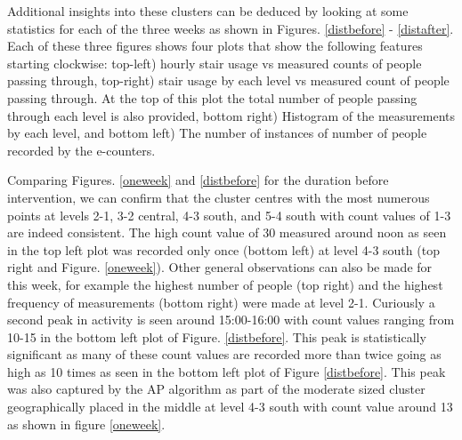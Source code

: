  
Additional insights into these clusters can be deduced by looking at some statistics for each of the three weeks as shown in Figures. \ref{distbefore} - \ref{distafter}. Each of these three figures shows four plots that show the following features starting clockwise: top-left) hourly stair usage vs measured counts of people passing through, top-right) stair usage by each level vs measured count of people passing through. At the top of this plot the total number of people passing through each level is also provided, bottom right) Histogram of the measurements by each level, and bottom left) The number of instances of number of people recorded by the e-counters.


Comparing Figures. \ref{oneweek} and \ref{distbefore} for the duration before intervention, we can confirm that the cluster centres with the most numerous points at levels 2-1, 3-2 central, 4-3 south, and 5-4 south with count values of 1-3 are indeed consistent. The high count value of 30 measured around noon as seen in the top left plot was recorded only once (bottom left) at level 4-3 south (top right and Figure. \ref{oneweek}). Other general observations can also be made for this week, for example the highest number of people (top right) and the highest frequency of measurements (bottom right) were made at level 2-1. Curiously a second peak in activity is seen around 15:00-16:00 with count values ranging from 10-15 in the bottom left plot of Figure. \ref{distbefore}. This peak is statistically significant as many of these count values are recorded more than twice going as high as 10 times as seen in the bottom left plot of Figure \ref{distbefore}. This peak was also captured by the AP algorithm as part of the moderate sized cluster geographically placed in the middle at level 4-3 south with count value around 13 as shown in figure \ref{oneweek}.
